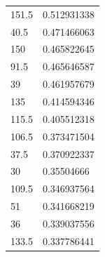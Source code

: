 \begin{longtable}{|l|l|}
 \rowcolor[HTML]{F8FF00} 
 151.5                                                   & 0.512931338                                                   \\
 \rowcolor[HTML]{F8FF00} 
 40.5                                                    & 0.471466063                                                   \\
 \rowcolor[HTML]{F8FF00} 
 150                                                     & 0.465822645                                                   \\
 \rowcolor[HTML]{F8FF00} 
 91.5                                                    & 0.465646587                                                   \\
 \rowcolor[HTML]{F8FF00} 
 39                                                      & 0.461957679                                                   \\
 \rowcolor[HTML]{F8FF00} 
 135                                                     & 0.414594346                                                   \\
 \rowcolor[HTML]{F8FF00} 
 115.5                                                   & 0.405512318                                                   \\
 \rowcolor[HTML]{F8FF00} 
 106.5                                                   & 0.373471504                                                   \\
 \rowcolor[HTML]{F8FF00} 
 37.5                                                    & 0.370922337                                                   \\
 \rowcolor[HTML]{F8FF00} 
 30                                                      & 0.35504666                                                    \\
 \rowcolor[HTML]{F8FF00} 
 109.5                                                   & 0.346937564                                                   \\
 \rowcolor[HTML]{F8FF00} 
 51                                                      & 0.341668219                                                   \\
 \rowcolor[HTML]{F8FF00} 
 36                                                      & 0.339037556                                                   \\
 \rowcolor[HTML]{F8FF00} 
 133.5                                                   & 0.337786441                                                   \\

\end{longtable}
